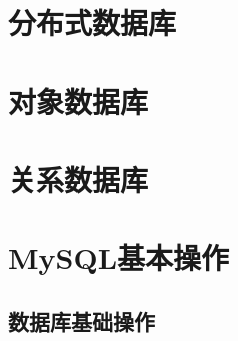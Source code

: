 \documentclass[UTF8]{../computerUniverse}
\begin{document}
    \section{分布式数据库}
    \section{对象数据库}
    \section{关系数据库}

    \section{MySQL基本操作}
    \subsection{数据库基础操作}
\end{document}
